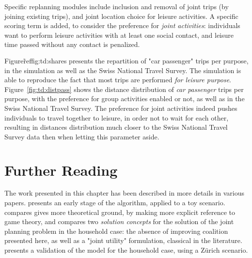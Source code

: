{Specific replanning modules include inclusion and removal of joint trips (by joining existing trips), and joint location choice for leisure activities. A specific scoring term is added, to consider the preference for \emph{joint activities}: individuals want to perform leisure activities with at least one social contact, and leisure time passed without any contact is penalized.

Figure\~ref{fig:td:shares} presents the repartition of "car passenger" trips per purpose, in the simulation as well as the Swiss National Travel Survey. The simulation is able to reproduce the fact that most trips are performed \emph{for leisure purpose}.
%
%
Figure~\ref{fig:td:distpass} shows the distance distribution of \emph{car passenger} trips per purpose, with the preference for group activities enabled or not, as well as in the Swiss National Travel Survey. The preference for joint activities indeed pushes individuals to travel together to leisure, in order not to wait for each other, resulting in distances distribution much closer to the
Swiss National Travel Survey data then when letting this parameter aside.


\section{Further Reading}
The work presented in this chapter has been described in more details in various papers. \citet{DubernetAxhausen_TransLett_2013} presents an early stage of the algorithm, applied to a toy scenario. \citet{DubernetAxhausen_STRC_2014} compares gives more theoretical ground, by making more explicit reference to game theory, and compares two \emph{solution concepts} for the solution of the joint planning problem in the household case: the absence of improving coalition presented here, as well as a "joint utility" formulation, classical in the literature. \citet{DubernetAxhausen_Transportation_forth} presents a validation of the model for the household case, using a Zürich scenario.

} %

